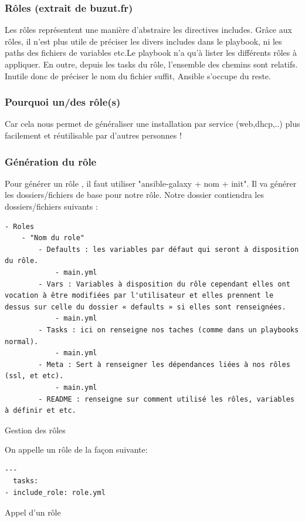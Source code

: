 \documentclass[a4paper, 12pt]{article}
\newenvironment{code}{\captionsetup{type=listing}}{}
\begin{document}
\subsubsection{Rôles (extrait de buzut.fr)}
Les rôles représentent une manière d'abstraire les directives includes. Grâce aux rôles, il n'est plus utile de
préciser les divers includes dans le playbook, ni les paths des fichiers de variables etc.​	Le playbook n'a qu'à
lister les différents rôles à appliquer. En outre, depuis les tasks du rôle, l'ensemble des chemins sont relatifs.
Inutile donc de préciser le nom du fichier suffit, Ansible s'occupe du reste.

\subsubsection{Pourquoi un/des rôle(s)}
Car cela nous permet de généraliser une installation par service (web,dhcp,..) plus facilement et réutilisable
par d'autres personnes !

\subsubsection{Génération du rôle}
Pour générer un rôle , il faut utiliser "ansible-galaxy + nom + init". Il va générer les dossiers/fichiers de
base pour notre rôle. Notre dossier contiendra les dossiers/fichiers suivants :
\begin{code}
    \begin{verbatim}
- Roles
    - "Nom du role"
        - Defaults : les variables par défaut qui seront à disposition du rôle.
            - main.yml
        - Vars : Variables à disposition du rôle cependant elles ont vocation à être modifiées par l'utilisateur et elles prennent le dessus sur celle du dossier « defaults » si elles sont renseignées.
            - main.yml
        - Tasks : ici on renseigne nos taches (comme dans un playbooks normal).
            - main.yml
        - Meta : Sert à renseigner les dépendances liées à nos rôles (ssl, et etc).
            - main.yml
        - README : renseigne sur comment utilisé les rôles, variables à définir et etc.
    \end{verbatim}
    \caption{Gestion des rôles}
    \label{gestion_roles}
\end{code}
\bigbreak
On appelle un rôle de la façon suivante:
\begin{code}
    \begin{verbatim}
---
  tasks:
- include_role: role.yml
    \end{verbatim}
    \caption{Appel d'un rôle}
    \label{appel_role}
\end{code}
\bigbreak
\end{document}
